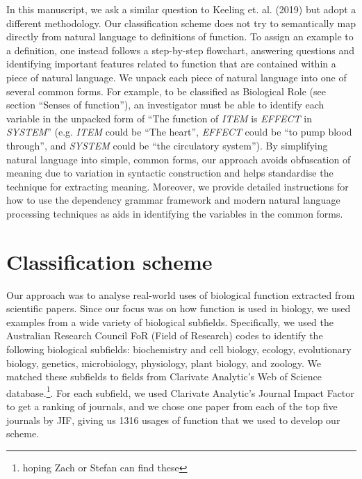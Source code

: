 \documentclass{article}
\begin{document}
In this manuscript, we ask a similar question to Keeling et. al. (2019) but adopt a different methodology.
Our classification scheme does not try to semantically map directly from natural language to definitions of function.
To assign an example to a definition, one instead follows a step-by-step flowchart, answering questions and identifying important features related to function that are contained within a piece of natural language.
We unpack each piece of natural language into one of several common forms.
For example, to be classified as Biological Role (see section ``Senses of function''), an investigator must be able to identify each variable in the unpacked form of ``The function of \emph{ITEM} is \emph{EFFECT} in \emph{SYSTEM}'' (e.g. \emph{ITEM} could be ``The heart'', \emph{EFFECT} could be ``to pump blood through'', and \emph{SYSTEM} could be ``the circulatory system'').
By simplifying natural language into simple, common forms, our approach avoids obfuscation of meaning due to variation in syntactic construction and helps standardise the technique for extracting meaning.
Moreover, we provide detailed instructions for how to use the dependency grammar framework and modern natural language processing techniques as aids in identifying the variables in the common forms.

\section{Classification scheme}
\label{sec:class-scheme}

Our approach was to analyse real-world uses of biological function extracted from scientific papers.
Since our focus was on how function is used in biology, we used examples from a wide variety of biological subfields.
Specifically, we used the Australian Research Council FoR (Field of Research) codes to identify the following biological subfields: biochemistry and cell biology, ecology, evolutionary biology, genetics, microbiology, physiology, plant biology, and zoology.
We matched these subfields to fields from Clarivate Analytic’s Web of Science database.\footnote{hoping Zach or Stefan can find these}.
For each subfield, we used Clarivate Analytic’s Journal Impact Factor to get a ranking of journals, and we chose one paper from each of the top five journals by JIF, giving us 1316 usages of function that we used to develop our scheme.
\end{document}
